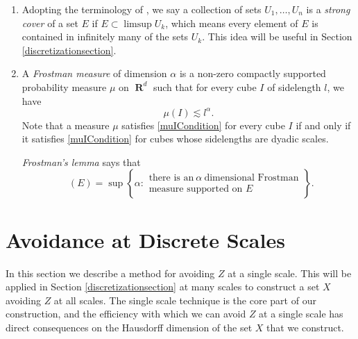 \documentclass[dvipsnames,letterpaper,12pt]{article}
\numberwithin{equation}{section}
\theoremstyle{plain}
\DeclareMathOperator{\hausdim}{\dim_{\mathbf{H}}}
\DeclareMathOperator{\RR}{\mathbf{R}}
\begin{document}
\begin{enumerate}

	\item\label{strongCoverDefn} Adopting the terminology of \cite{KatzTao}, we say a collection of sets $U_1, \dots, U_n$ is a {\it strong cover} of a set $E$ if $E \subset \limsup U_k$, which means every element of $E$ is contained in infinitely many of the sets $U_k$. This idea will be useful in Section \ref{discretizationsection}.  


	\item\label{frostmanItem} A {\it Frostman measure} of dimension $\alpha$ is a non-zero compactly supported probability measure $\mu$ on $\RR^d$ such that for every cube $I$ of sidelength $l$, we have
	\begin{equation}\label{muICondition}
	\mu(I) \lesssim l^\alpha.
	\end{equation}
	Note that a measure $\mu$ satisfies \eqref{muICondition} for every cube $I$ if and only if it satisfies \eqref{muICondition} for cubes whose sidelengths are dyadic scales.  

	 {\it Frostman's lemma} says that
	\[ \hausdim(E) = \sup \left\{ \alpha: \begin{array}{c} \text{there is an}\ \alpha\ \text{dimensional Frostman}\\
	\text{measure supported on $E$} \end{array} \right\}. \]
\end{enumerate}









\section{Avoidance at Discrete Scales}\label{discretesection}


In this section we describe a method for avoiding $Z$ at a single scale. This will be applied in Section \ref{discretizationsection} at many scales to construct a set $X$ avoiding $Z$ at all scales. The single scale technique is the core part of our construction, and the efficiency with which we can avoid $Z$ at a single scale has direct consequences on the Hausdorff dimension of the set $X$ that we construct.
\end{document}
